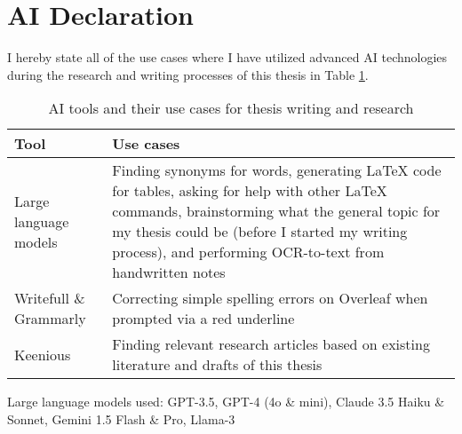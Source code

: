 


\chapter*{AI Declaration\label{extra:declaration}}
\begin{comment}
\end{comment}


I hereby state all of the use cases where I have utilized advanced AI technologies during the research and writing processes of this thesis in Table \ref{table:declaration}.


\begin{table}[ht!] 
\centering 
\renewcommand{\arraystretch}{1.5} %
\setlength{\tabcolsep}{5pt} %
\begin{tabularx}{\textwidth}{|l|X|} %
\hline  
\textbf{Tool} & \textbf{Use cases} \\ \hline  
Large language models & Finding synonyms for words, generating LaTeX code for tables, asking for help with other LaTeX commands, brainstorming what the general topic for my thesis could be (before I started my writing process), and performing OCR-to-text from handwritten notes\\ \hline  
Writefull \& Grammarly & Correcting simple spelling errors on Overleaf when prompted via a red underline\\ \hline  
Keenious & Finding relevant research articles based on existing literature and drafts of this thesis\\ \hline  
\end{tabularx}  
\caption{AI tools and their use cases for thesis writing and research}  
\label{table:declaration}  
\end{table}  

Large language models used: GPT-3.5, GPT-4 (4o \& mini), Claude 3.5 Haiku \& Sonnet, Gemini 1.5 Flash \& Pro, Llama-3
